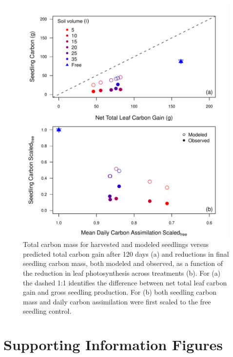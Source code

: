 \documentclass[a4paper]{article}\usepackage[]{graphicx}\usepackage[]{color}
\begin{document}
\begin{figure}[h!]
    \centering
    \includegraphics[width=0.99\textwidth]{massmodel_totalC.pdf}
    \caption{Total carbon mass for harvested and modeled seedlings versus predicted total carbon gain after 120 days (a) and  reductions in final seedling carbon mass, both modeled and observed, as a function of the reduction in leaf photosynthesis across treatments (b). For (a) the dashed 1:1 identifies the difference between net total leaf carbon gain and gross seedling production. For (b) both seedling carbon mass and daily carbon assimilation were first scaled to the free seedling control.}
    \label{fig:figure6}
\end{figure}

\clearpage
\section{Supporting Information Figures}

\renewcommand\thefigure{S\arabic{figure}}    
\setcounter{figure}{0}   
\end{document}
